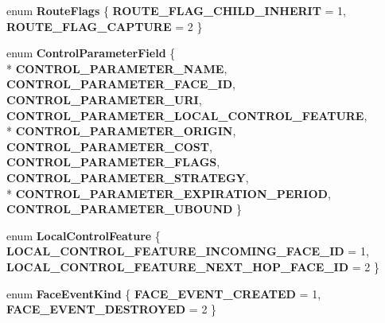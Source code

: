 \begin{DoxyCompactItemize}
\item 
enum {\bfseries Route\+Flags} \{ {\bfseries R\+O\+U\+T\+E\+\_\+\+F\+L\+A\+G\+\_\+\+C\+H\+I\+L\+D\+\_\+\+I\+N\+H\+E\+R\+IT} = 1, 
{\bfseries R\+O\+U\+T\+E\+\_\+\+F\+L\+A\+G\+\_\+\+C\+A\+P\+T\+U\+RE} = 2
 \}\hypertarget{group__management_ga378a5a1ad39850874c435b02a9d069dd}{}\label{group__management_ga378a5a1ad39850874c435b02a9d069dd}

\item 
enum {\bfseries Control\+Parameter\+Field} \{ \\*
{\bfseries C\+O\+N\+T\+R\+O\+L\+\_\+\+P\+A\+R\+A\+M\+E\+T\+E\+R\+\_\+\+N\+A\+ME}, 
{\bfseries C\+O\+N\+T\+R\+O\+L\+\_\+\+P\+A\+R\+A\+M\+E\+T\+E\+R\+\_\+\+F\+A\+C\+E\+\_\+\+ID}, 
{\bfseries C\+O\+N\+T\+R\+O\+L\+\_\+\+P\+A\+R\+A\+M\+E\+T\+E\+R\+\_\+\+U\+RI}, 
{\bfseries C\+O\+N\+T\+R\+O\+L\+\_\+\+P\+A\+R\+A\+M\+E\+T\+E\+R\+\_\+\+L\+O\+C\+A\+L\+\_\+\+C\+O\+N\+T\+R\+O\+L\+\_\+\+F\+E\+A\+T\+U\+RE}, 
\\*
{\bfseries C\+O\+N\+T\+R\+O\+L\+\_\+\+P\+A\+R\+A\+M\+E\+T\+E\+R\+\_\+\+O\+R\+I\+G\+IN}, 
{\bfseries C\+O\+N\+T\+R\+O\+L\+\_\+\+P\+A\+R\+A\+M\+E\+T\+E\+R\+\_\+\+C\+O\+ST}, 
{\bfseries C\+O\+N\+T\+R\+O\+L\+\_\+\+P\+A\+R\+A\+M\+E\+T\+E\+R\+\_\+\+F\+L\+A\+GS}, 
{\bfseries C\+O\+N\+T\+R\+O\+L\+\_\+\+P\+A\+R\+A\+M\+E\+T\+E\+R\+\_\+\+S\+T\+R\+A\+T\+E\+GY}, 
\\*
{\bfseries C\+O\+N\+T\+R\+O\+L\+\_\+\+P\+A\+R\+A\+M\+E\+T\+E\+R\+\_\+\+E\+X\+P\+I\+R\+A\+T\+I\+O\+N\+\_\+\+P\+E\+R\+I\+OD}, 
{\bfseries C\+O\+N\+T\+R\+O\+L\+\_\+\+P\+A\+R\+A\+M\+E\+T\+E\+R\+\_\+\+U\+B\+O\+U\+ND}
 \}\hypertarget{group__management_gaec5bc42bf168e30ec8134951c9d8e384}{}\label{group__management_gaec5bc42bf168e30ec8134951c9d8e384}

\item 
enum {\bfseries Local\+Control\+Feature} \{ {\bfseries L\+O\+C\+A\+L\+\_\+\+C\+O\+N\+T\+R\+O\+L\+\_\+\+F\+E\+A\+T\+U\+R\+E\+\_\+\+I\+N\+C\+O\+M\+I\+N\+G\+\_\+\+F\+A\+C\+E\+\_\+\+ID} = 1, 
{\bfseries L\+O\+C\+A\+L\+\_\+\+C\+O\+N\+T\+R\+O\+L\+\_\+\+F\+E\+A\+T\+U\+R\+E\+\_\+\+N\+E\+X\+T\+\_\+\+H\+O\+P\+\_\+\+F\+A\+C\+E\+\_\+\+ID} = 2
 \}\hypertarget{group__management_ga3a4ae997626d42eb2ecb7145abd308a8}{}\label{group__management_ga3a4ae997626d42eb2ecb7145abd308a8}

\item 
enum {\bfseries Face\+Event\+Kind} \{ {\bfseries F\+A\+C\+E\+\_\+\+E\+V\+E\+N\+T\+\_\+\+C\+R\+E\+A\+T\+ED} = 1, 
{\bfseries F\+A\+C\+E\+\_\+\+E\+V\+E\+N\+T\+\_\+\+D\+E\+S\+T\+R\+O\+Y\+ED} = 2
 \}\hypertarget{group__management_ga3b6d0a60c7023346dfe65c62bd1c0667}{}\label{group__management_ga3b6d0a60c7023346dfe65c62bd1c0667}

\end{DoxyCompactItemize}


